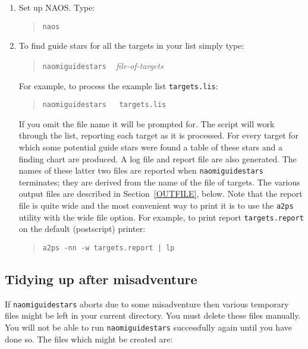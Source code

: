 \documentclass[twoside,11pt]{article}
\newcommand{\xref}[3]{#1}
\renewcommand{\_}{\texttt{\symbol{95}}}
\begin{document}
\begin{enumerate}
  \item Set up NAOS.  Type:

  \begin{quote}
   {\tt naos}
  \end{quote}

  \item To find guide stars for all the targets in your list simply type:

  \begin{quote}
   {\tt naomiguidestars} ~ {\it file-of-targets}
  \end{quote}

   For example, to process the example list {\tt targets.lis}:

  \begin{quote}
   {\tt naomiguidestars ~ targets.lis}
  \end{quote}

   If you omit the file name it will be prompted for.  The script will
   work through the list, reporting each target as it is processed.  For
   every target for which some potential guide stars were found a table
   of these stars and a finding chart are produced.  A log file and
   report file are also generated.  The names of these latter two files
   are reported when {\tt naomiguidestars} terminates; they are derived
   from the name of the file of targets.  The various output files are
   described in Section~\ref{OUTFILE}, below.  Note that the report file
   is quite wide and the most convenient way to print it is to use the
   \xref{{\tt a2ps}}{sun184}{} utility\cite{SUN184} with the wide file
   option.  For example, to print report {\tt targets.report} on the
   default (postscript) printer:

  \begin{quote}
   {\tt a2ps -nn -w targets.report | lp}
  \end{quote}

\end{enumerate}

\subsection{Tidying up after misadventure}

If {\tt naomiguidestars} aborts due to some misadventure then various
temporary files might be left in your current directory.  You must delete
these files manually.  You will not be able to run {\tt naomiguidestars}
successfully again until you have done so.  The files which might be
created are:
\end{document}
